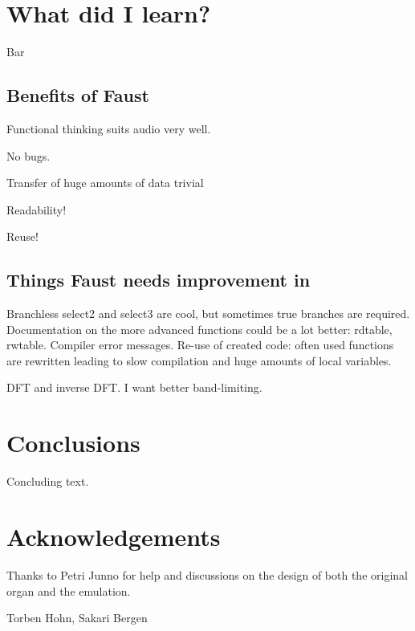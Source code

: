 \documentclass[11pt,a4paper]{article}
\begin{document}
\section{What did I learn?}

Bar


\subsection{Benefits of Faust}

Functional thinking suits audio very well.

No bugs.

Transfer of huge amounts of data trivial

Readability!

Reuse!


\subsection{Things Faust needs improvement in}

Branchless select2 and select3 are cool, but sometimes true branches are required.
Documentation on the more advanced functions could be a lot better: rdtable, rwtable.
Compiler error messages.
Re-use of created code: often used functions are rewritten leading to slow compilation and huge amounts of local variables.

DFT and inverse DFT. I want better band-limiting.

\section{Conclusions}

Concluding text.

\section{Acknowledgements}

Thanks to Petri Junno for help and discussions on the design of both the original organ and the emulation.

Torben Hohn, Sakari Bergen





\end{document}
